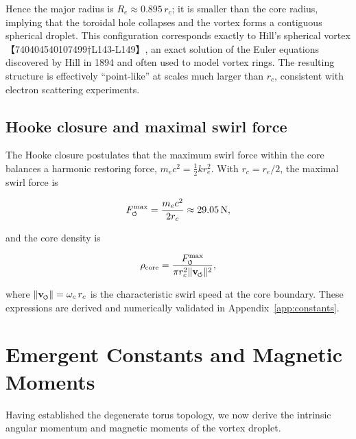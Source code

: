 \documentclass[11pt]{article}
\newcommand{\Fmax}{F^{\max}_{\mkern-1mu\scriptscriptstyle\boldsymbol{\circlearrowleft}}}
\newcommand{\vnorm}{\lVert \mathbf{v}_{\mkern-2mu\scriptscriptstyle\boldsymbol{\circlearrowleft}} \rVert}  %
\newcommand{\rc}{r_c}                                    %
\newcommand{\rhocore}{\rho_{\text{core}}}
\begin{document}
Hence the major radius is $R_e \approx 0.895\,\rc$; it is smaller than the core radius, implying that the toroidal hole collapses and the vortex forms a contiguous spherical droplet.  This configuration corresponds exactly to Hill's spherical vortex【740404540107499†L143-L149】, an exact solution of the Euler equations discovered by Hill in 1894 and often used to model vortex rings.  The resulting structure is effectively ``point‑like'' at scales much larger than $\rc$, consistent with electron scattering experiments.






\subsection{Hooke closure and maximal swirl force}


The Hooke closure postulates that the maximum swirl force within the core balances a harmonic restoring force, $m_e c^2 = \tfrac{1}{2} k r_e^2$.  With $\rc = r_e/2$, the maximal swirl force is


\begin{equation}


    \Fmax = \frac{m_e c^2}{2\rc} \approx 29.05\,\text{N},


\end{equation}


and the core density is


\begin{equation}


    \rhocore = \frac{\Fmax}{\pi \rc^2 \vnorm^2},


\end{equation}


where $\vnorm = \omega_c\,\rc$ is the characteristic swirl speed at the core boundary.  These expressions are derived and numerically validated in Appendix~\ref{app:constants}.








\section{Emergent Constants and Magnetic Moments}


\label{sec:emergent_constants}


Having established the degenerate torus topology, we now derive the intrinsic angular momentum and magnetic moments of the vortex droplet.
\end{document}
